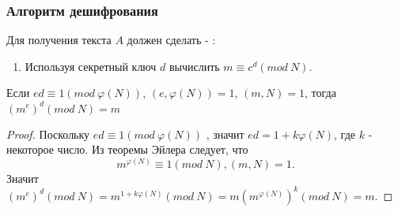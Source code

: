   \subsubsection{Алгоритм дешифрования}
  Для получения текста $A$ должен сделать - \cite[Глава 9, страницы 148-155]{tilb06}:
    
    \begin{enumerate}
     \item Используя секретный ключ $d$ вычислить $m \equiv c^{d} (mod \: N)$.
    \end{enumerate}  
    
  \begin{theorem}
    Если $ed \equiv 1(mod \: \varphi(N))$, $(e, \varphi(N)) = 1$, $(m, N)=1$, тогда $(m^{e})^{d} (mod \: N) = m$

    \begin{proof}
      Поскольку $ed \equiv 1(mod \: \varphi(N))$ , значит $ed = 1 + k \varphi(N)$, где $k$ - некоторое число. Из теоремы Эйлера следует,
      что 
        \begin{equation}
          m^{\varphi(N)} \equiv 1(mod \: N), (m, N) = 1.
        \end{equation}
      Значит $(m^e)^d (mod \: N) = m^{1 + k \varphi(N)}(mod \: N) = m (m^{\varphi(N)})^k (mod \: N) = m$.
    \end{proof}
  \end{theorem}